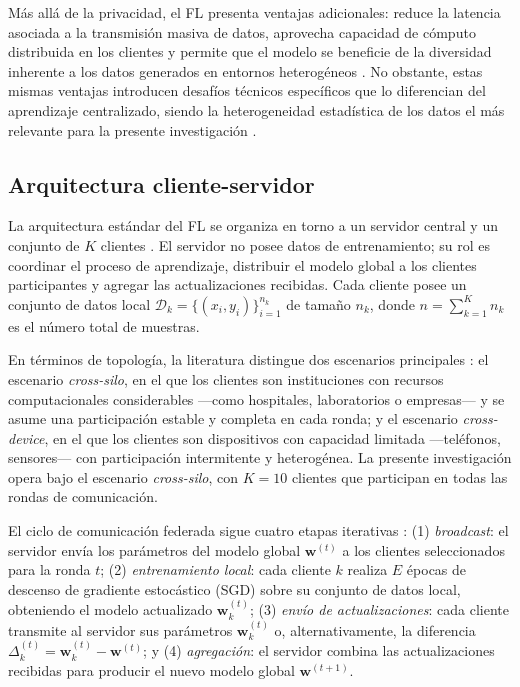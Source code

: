 Más allá de la privacidad, el FL presenta ventajas adicionales: reduce la latencia asociada a
la transmisión masiva de datos, aprovecha capacidad de cómputo distribuida en los clientes y
permite que el modelo se beneficie de la diversidad inherente a los datos generados en entornos
heterogéneos \cite{DBLP:journals/corr/abs-1912-04977}. No obstante, estas mismas ventajas
introducen desafíos técnicos específicos que lo diferencian del aprendizaje centralizado, siendo
la heterogeneidad estadística de los datos el más relevante para la presente investigación
\cite{al2502principles}.

\subsection{Arquitectura cliente-servidor}

La arquitectura estándar del FL se organiza en torno a un servidor central y un conjunto de
$K$ clientes \cite{al2502principles}. El servidor no posee datos de entrenamiento; su rol es
coordinar el proceso de aprendizaje, distribuir el modelo global a los clientes participantes
y agregar las actualizaciones recibidas. Cada cliente posee un conjunto de datos local
$\mathcal{D}_k = \{(x_i, y_i)\}_{i=1}^{n_k}$ de tamaño $n_k$, donde $n = \sum_{k=1}^K n_k$
es el número total de muestras.

En términos de topología, la literatura distingue dos escenarios principales
\cite{DBLP:journals/corr/abs-1912-04977}: el escenario \textit{cross-silo}, en el que los
clientes son instituciones con recursos computacionales considerables —como hospitales,
laboratorios o empresas— y se asume una participación estable y completa en cada ronda; y
el escenario \textit{cross-device}, en el que los clientes son dispositivos con capacidad
limitada —teléfonos, sensores— con participación intermitente y heterogénea. La presente
investigación opera bajo el escenario \textit{cross-silo}, con $K = 10$ clientes que
participan en todas las rondas de comunicación.

El ciclo de comunicación federada sigue cuatro etapas iterativas
\cite{DBLP:journals/corr/McMahanMRA16, al2502principles}:
(1) \textit{broadcast}: el servidor envía los parámetros del modelo global $\mathbf{w}^{(t)}$
a los clientes seleccionados para la ronda $t$;
(2) \textit{entrenamiento local}: cada cliente $k$ realiza $E$ épocas de descenso de gradiente
estocástico (SGD) sobre su conjunto de datos local, obteniendo el modelo actualizado
$\mathbf{w}_k^{(t)}$;
(3) \textit{envío de actualizaciones}: cada cliente transmite al servidor sus parámetros
$\mathbf{w}_k^{(t)}$ o, alternativamente, la diferencia $\Delta_k^{(t)} = \mathbf{w}_k^{(t)} -
\mathbf{w}^{(t)}$; y
(4) \textit{agregación}: el servidor combina las actualizaciones recibidas para producir el nuevo
modelo global $\mathbf{w}^{(t+1)}$.


